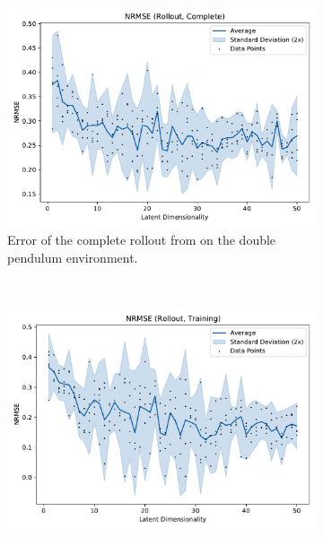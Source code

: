 			\begin{figure}
				\centering
				\begin{subfigure}{0.7\linewidth}
					\centering
					\includegraphics[width=\linewidth]{figures/results/acrobot-gym/latent-dim/comparison-rmse-rollout-normalized-mean-vs-latent-dim.pdf}
					\caption[Error of the complete rollout on the double pendulum environment]{Error of the complete rollout from on the double pendulum environment.}
					\label{fig:acrobotRmseComplete}
				\end{subfigure} \\
				\begin{subfigure}{0.5\linewidth}
					\centering
					\includegraphics[width=\linewidth]{figures/results/acrobot-gym/latent-dim/comparison-rmse-rollout-train-normalized-mean-vs-latent-dim.pdf}

\end{subfigure}
\end{figure}

